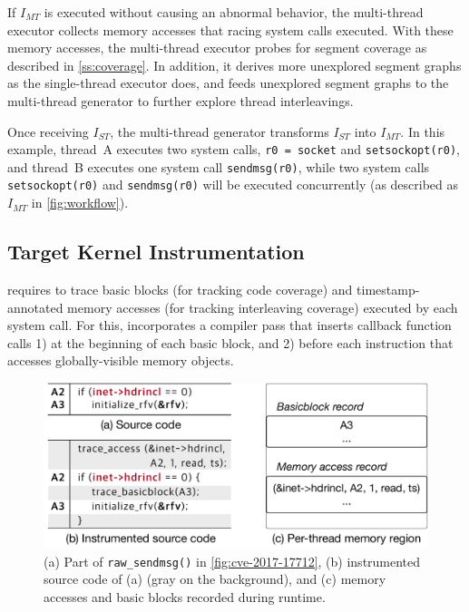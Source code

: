 If $I_{MT}$ is executed without causing an abnormal behavior, the
multi-thread executor collects memory accesses that racing system
calls executed.
%
With these memory accesses, the multi-thread executor probes for
segment coverage as described in \autoref{ss:coverage}. In addition,
it derives more unexplored segment graphs as the single-thread
executor does, and feeds unexplored segment graphs to the multi-thread
generator to further explore thread interleavings.



%
Once receiving $I_{ST}$, the multi-thread generator transforms
$I_{ST}$ into $I_{MT}$. In this example, thread~A executes two system
calls, \texttt{r0 = socket{}} and \texttt{setsockopt(r0)}, and
thread~B executes one system call \texttt{sendmsg(r0)}, while two
system calls \texttt{setsockopt(r0)} and \texttt{sendmsg(r0)} will be
executed concurrently (as described as $I_{MT}$ in
\autoref{fig:workflow}).
%





\subsection{Target Kernel Instrumentation}
\label{ss:instrumentation}

\sys requires to trace basic blocks (for tracking code coverage) and
timestamp-annotated memory accesses (for tracking interleaving
coverage) executed by each system call.
%
For this, \sys incorporates a compiler pass that inserts callback
function calls 1) at the beginning of each basic block, and 2) before
each instruction that accesses globally-visible memory objects.
%



\begin{figure}
  \centering
  \includegraphics[width=0.9\linewidth]{fig/instrumentation.pdf}
  \caption{(a) Part of \texttt{raw_sendmsg()} in
    \autoref{fig:cve-2017-17712}, (b) instrumented source code of (a)
    (gray on the background), and (c) memory accesses and basic blocks
    recorded during runtime.}
  \label{fig:instrumentation}
\end{figure}

